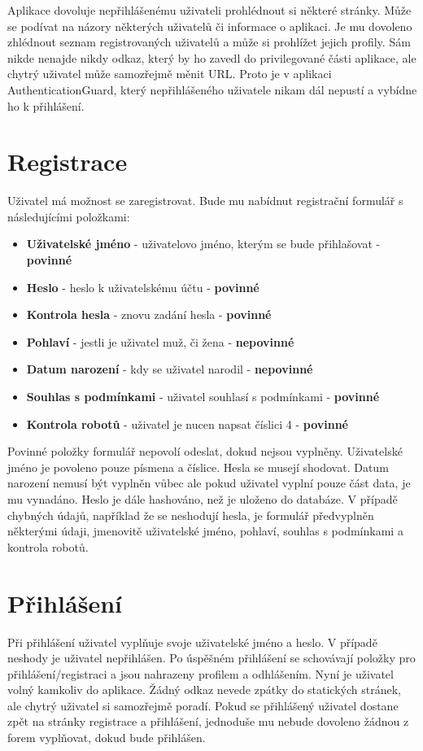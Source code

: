 \documentclass[
12pt,
a4paper,
pdftex,
czech,
titlepage
]{report}
\begin{document}
Aplikace dovoluje nepřihlášenému uživateli prohlédnout si některé stránky. Může se podívat na názory některých uživatelů či informace o aplikaci. Je mu dovoleno zhlédnout seznam registrovaných uživatelů a může si prohlížet jejich profily. Sám nikde nenajde nikdy odkaz, který by ho zavedl do privilegované části aplikace, ale chytrý uživatel může samozřejmě měnit URL. Proto je v aplikaci AuthenticationGuard, který nepřihlášeného uživatele nikam dál nepustí a vybídne ho k přihlášení.

\section{Registrace}

Uživatel má možnost se zaregistrovat. Bude mu nabídnut registrační formulář s následujícími položkami:
\begin{itemize}
\item \textbf{Uživatelské jméno} - uživatelovo jméno, kterým se bude přihlašovat - \textbf{povinné}
\item \textbf{Heslo} - heslo k uživatelskému účtu - \textbf{povinné}
\item \textbf{Kontrola hesla} - znovu zadání hesla - \textbf{povinné}
\item \textbf{Pohlaví} - jestli je uživatel muž, či žena - \textbf{nepovinné}
\item \textbf{Datum narození} - kdy se uživatel narodil - \textbf{nepovinné}
\item \textbf{Souhlas s podmínkami} - uživatel souhlasí s podmínkami - \textbf{povinné}
\item \textbf{Kontrola robotů} - uživatel je nucen napsat číslici 4 - \textbf{povinné}
\end{itemize}

Povinné položky formulář nepovolí odeslat, dokud nejsou vyplněny. Uživatelské jméno je povoleno pouze písmena a číslice. Hesla se musejí shodovat. Datum narození nemusí být vyplněn vůbec ale pokud uživatel vyplní pouze část data, je mu vynadáno. Heslo je dále hashováno, než je uloženo do databáze. V případě chybných údajů, například že se neshodují hesla, je formulář předvyplněn některými údaji, jmenovitě uživatelské jméno, pohlaví, souhlas s podmínkami a kontrola robotů.

\section{Přihlášení}

Při přihlášení uživatel vyplňuje svoje uživatelské jméno a heslo. V případě neshody je uživatel nepřihlášen. Po úspěšném přihlášení se schovávají položky pro přihlášení/registraci a jsou nahrazeny profilem a odhlášením. Nyní je uživatel volný kamkoliv do aplikace. Žádný odkaz nevede zpátky do statických stránek, ale chytrý uživatel si samozřejmě poradí. Pokud se přihlášený uživatel dostane zpět na stránky registrace a přihlášení, jednoduše mu nebude dovoleno žádnou z forem vyplňovat, dokud bude přihlášen.
\end{document}
